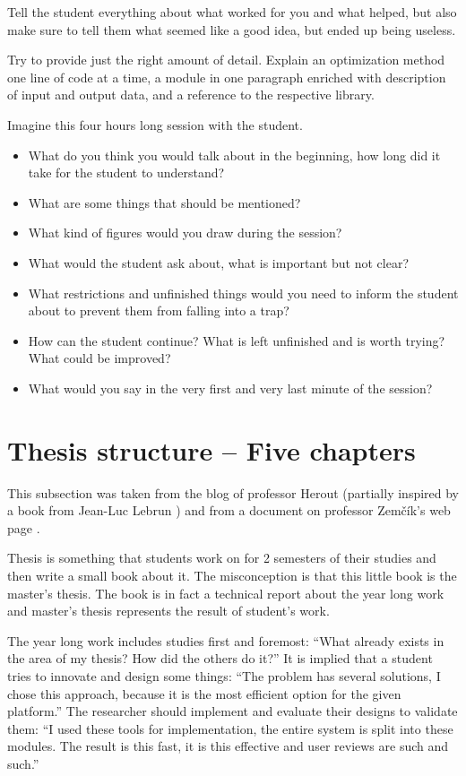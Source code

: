 Tell the student everything about what worked for you and what helped, but also make sure to tell them what seemed like a good idea, but ended up being useless.

Try to provide just the right amount of detail. Explain an optimization method one line of code at a time, a module in one paragraph enriched with description of input and output data, and a reference to the respective library.

Imagine this four hours long session with the student.
\begin{itemize}
  \item{What do you think you would talk about in the beginning, how long did it take for the student to understand?}
  \item{What are some things that should be mentioned?}
  \item{What kind of figures would you draw during the session?}
  \item{What would the student ask about, what is important but not clear?}
  \item{What restrictions and unfinished things would you need to inform the student about to prevent them from falling into a trap?}
  \item{How can the student continue? What is left unfinished and is worth trying? What could be improved?}
  \item{What would you say in the very first and very last minute of the session?}
\end{itemize}


\section{Thesis structure -- Five chapters}

This subsection was taken from the blog of professor Herout\cite{Herout} (partially inspired by a book from Jean-Luc Lebrun \cite{Lebrun2011}) and from a document on professor Zemčík's web page \cite{Zemcik}.
\bigskip

Thesis is something that students work on for 2 semesters of their studies and then write a small book about it. The misconception is that this little book is the master's thesis. The book is in fact a technical report about the year long work and master's thesis represents the result of student's work.

The year long work includes studies first and foremost: ``What already exists in the area of my thesis? How did the others do it?'' It is implied that a student tries to innovate and design some things: ``The problem has several solutions, I chose this approach, because it is the most efficient option for the given platform.''
The researcher should implement and evaluate their designs to validate them: ``I used these tools for implementation, the entire system is split into these modules. The result is this fast, it is this effective and user reviews are such and such.''

